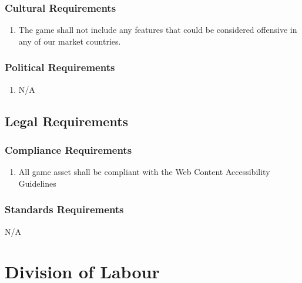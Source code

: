 \documentclass[12pt, titlepage]{article}
\begin{document}
\subsubsection{Cultural Requirements}
\label{ssub:cultural_requirements}
\begin{enumerate}[{CP}1. ]
        \item The game shall not include any features that could be considered offensive in any of our market countries.
\end{enumerate}

\subsubsection{Political Requirements}
\label{ssub:political_requirements}
\begin{enumerate}[]
        \item N/A
\end{enumerate}


\subsection{Legal Requirements}
\label{sub:legal_requirements}

\subsubsection{Compliance Requirements}
\label{ssub:compliance_requirements}
\begin{enumerate}[{LR}1. ]
        \item All game asset shall be compliant with the Web Content Accessibility Guidelines
\end{enumerate}

\subsubsection{Standards Requirements}
\label{ssub:standards_requirements}
N/A



\newpage

\section{Division of Labour}
\end{document}
